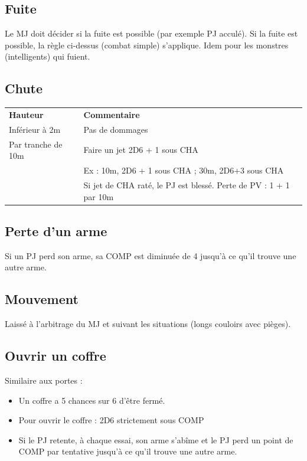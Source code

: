 \documentclass[a4paper, 11pt, twoside]{article}
\begin{document}
\subsection{Fuite}
\label{sec:org0a42a6c}

Le MJ doit décider si la fuite est possible (par exemple PJ acculé). Si la fuite est possible, la règle ci-dessus (combat simple) s'applique. Idem pour les monstres (intelligents) qui fuient.

\newpage

\subsection{Chute}
\label{sec:orgc95fd69}

\begin{longtable}{ll}
\textbf{Hauteur} & \textbf{Commentaire}\\
Inférieur à 2m & Pas de dommages\\
Par tranche de 10m & Faire un jet 2D6 + 1 sous CHA\\
 & Ex : 10m, 2D6 + 1 sous CHA ; 30m, 2D6+3 sous CHA\\
 & Si jet de CHA raté, le PJ est blessé. Perte de PV : 1 + 1 par 10m\\
\end{longtable}

\subsection{Perte d'un arme}
\label{sec:orga44713e}

Si un PJ perd son arme, sa COMP est diminuée de 4 jusqu'à ce qu'il trouve une autre arme.

\subsection{Mouvement}
\label{sec:org47fb50e}

Laissé à l'arbitrage du MJ et suivant les situations (longs couloirs avec pièges).

\subsection{Ouvrir un coffre}
\label{sec:org13c8d4c}

Similaire aux portes :
\begin{itemize}
\item Un coffre a 5 chances sur 6 d'être fermé.
\item Pour ouvrir le coffre : 2D6 strictement sous COMP
\item Si le PJ retente, à chaque essai, son arme s'abîme et le PJ perd un point de COMP par tentative jusqu'à ce qu'il trouve une autre arme.
\end{itemize}
\end{document}
